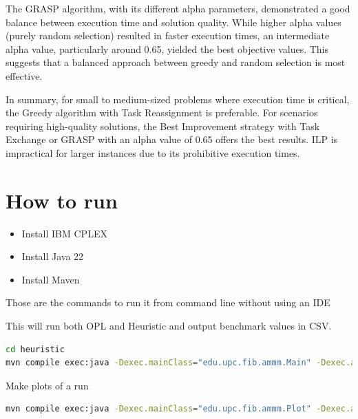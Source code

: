 \documentclass{article}
\begin{document}
The GRASP algorithm, with its different alpha parameters, demonstrated a good balance between execution time and solution quality. While higher alpha values (purely random selection) resulted in faster execution times, an intermediate alpha value, particularly around 0.65, yielded the best objective values. This suggests that a balanced approach between greedy and random selection is most effective.

In summary, for small to medium-sized problems where execution time is critical, the Greedy algorithm with Task Reassignment is preferable. For scenarios requiring high-quality solutions, the Best Improvement strategy with Task Exchange or GRASP with an alpha value of 0.65 offers the best results. ILP is impractical for larger instances due to its prohibitive execution times.


\section{How to run}

\begin{itemize}
  \item Install IBM CPLEX
  \item Install Java 22
  \item Install Maven
\end{itemize}

Those are the commands to run it from command line without using an IDE

This will run both OPL and Heuristic and output benchmark values in CSV.

\begin{lstlisting}[language=bash]
cd heuristic
mvn compile exec:java -Dexec.mainClass="edu.upc.fib.ammm.Main" -Dexec.args="../opl"
\end{lstlisting}

Make plots of a run

\begin{lstlisting}[language=bash]
mvn compile exec:java -Dexec.mainClass="edu.upc.fib.ammm.Plot" -Dexec.args="output.csv"
\end{lstlisting}
\end{document}
